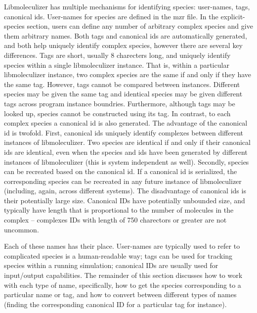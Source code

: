 Libmoleculizer has multiple mechanisms for identifying species:
user-names, tags, canonical ids.  User-names for species are defined
in the mzr file.  In the explicit-species section, users can define
any number of arbitrary complex species and give them arbitrary
names.  Both tags and canonical ids are automatically generated, and
both help uniquely identify complex species, however there are several
key differences.  Tags are short, usually 8 charecters long, and
uniquely identify species within a single libmoleculizer instance.
That is, within a particular libmoleculizer instance, two complex
species are the same if and only if they have the same tag.  However,
tags cannot be compared between instances.  Different species may be
given the same tag and identical species may be given different tags
across program instance boundries.  Furthermore, although tags may be
looked up, species cannot be constructed using its tag.  In contrast,
to each complex species a canonical id is also generated.  The
advantage of the canonical id is twofold.  First, canonical ids
uniquely identify complexes between different instances of
libmoleculizer.  Two species are identical if and only if their
canonical ids are identical, even when the species and ids have been
generated by different instances of libmoleculizer (this is system
independent as well).  Secondly, species can be recreated based on the
canonical id.  If a canonical id is serialized, the corresponding
species can be recreated in any future instance of libmoleculizer
(including, again, across different systems).  The disadvantage of
canonical ids is their potentially large size.  Canonical IDs have
potentially unbounded size, and typically have length that is
proportional to the number of molecules in the complex -- complexes
IDs with length of 750 charectors or greater are not uncommon.

Each of these names has their place.  User-names are typically used to
refer to complicated species is a human-readable way; tags can be used
for tracking species within a running simulation; canonical IDs are
usually used for input/output capabilities.  The remainder of this
section discusses how to work with each type of name, specifically,
how to get the species corresponding to a particular name or tag, and
how to convert between different types of names (finding the
corresponding canonical ID for a particular tag for instance).

